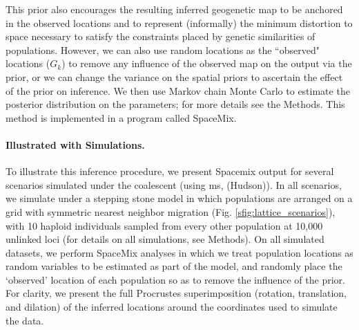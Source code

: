 \documentclass[12pt]{article}
\newcommand{\plrm}[1]{\todo[color=green!20]{#1}}
\newcommand{\plrm}[1]{\plr{#1}}
\newcommand{\plr}[1]{{\it\color{green}{(#1)}}}
\begin{document}
This prior also encourages the resulting inferred geogenetic map to be anchored in the observed locations and to represent (informally) the minimum distortion to space necessary to satisfy the constraints placed by genetic similarities of populations.  However, we can also use random locations as the ``observed" locations ($G_k$) to remove any influence of the observed map on the output via the prior, or we can change the variance on the spatial priors to ascertain the effect of the prior on inference. 
We then use Markov chain Monte Carlo to estimate the posterior distribution on the parameters; for more details see the Methods. 
This method is implemented in a program called SpaceMix.



\paragraph{Illustrated with Simulations.} To illustrate this inference procedure, we present Spacemix output for several scenarios simulated under the coalescent (using \textrm{ms}, (Hudson)).  In all scenarios, we simulate under a stepping stone model in which populations are arranged on a grid with symmetric nearest neighbor migration (Fig. \ref{sfig:lattice_scenarios}), with 10 haploid individuals sampled from every other population at 10,000 unlinked loci (for details on all simulations, see Methods).  On all simulated datasets, we perform SpaceMix analyses in which we treat population locations as random variables to be estimated as part of the model, and randomly place the `observed' location of each population so as to remove the influence of the prior.  For clarity, we present the full Procrustes superimposition (rotation, translation, and dilation)
of the inferred locations around the coordinates used to simulate the data.
\end{document}
